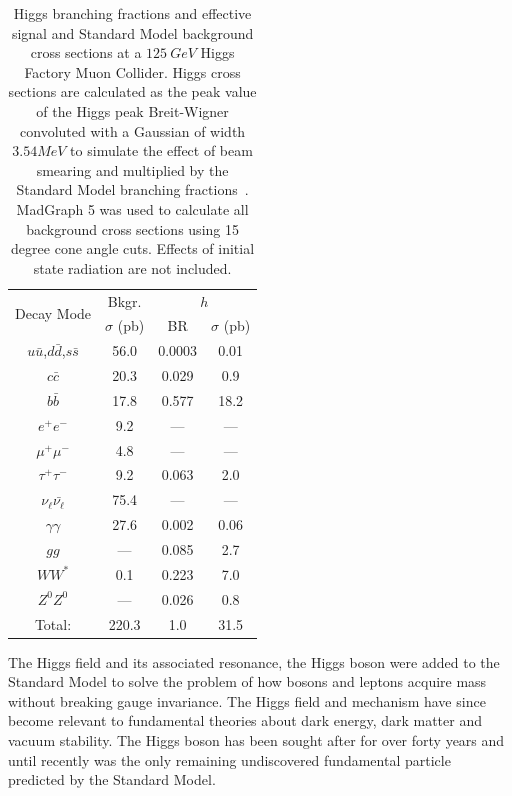 \documentclass[a4paper]{article}
\begin{document}
\begin{table}
	\begin{center}
		\begin{tabular}{|c|c|c|c|}
			\hline
			\multirow{2}{*}{Decay Mode} & Bkgr. & \multicolumn{2}{|c|}{$h$} \\ \cline{2-4}
			 & $\sigma$ (pb) & BR & $\sigma$ (pb) \\ 
			\hline
			$u\bar{u}$,$d\bar{d}$,$s\bar{s}$ & 56.0 & 0.0003 & 0.01 \\ \hline
			$c\bar{c}$      & 20.3 & 0.029 & 0.9 \\ \hline
			$b\bar{b}$      & 17.8 & 0.577 & 18.2 \\ \hline
			$e^+e^-$        & 9.2 & --- & --- \\ \hline
			$\mu^+\mu^-$    & 4.8 & --- & --- \\ \hline
			$\tau^+\tau^-$  & 9.2 & 0.063 & 2.0 \\ \hline
			$\nu_{\ell}\bar{\nu_{\ell}}$    & 75.4  & --- & --- \\ \hline
			$\gamma\gamma$  & 27.6   & 0.002 & 0.06 \\ \hline
			$gg$                    & ---   & 0.085 & 2.7 \\ \hline
			$WW^*$                  & 0.1   & 0.223 & 7.0 \\ \hline
			$Z^0Z^0$                & ---   & 0.026 & 0.8 \\
			\hline \hline
			Total:  & 220.3 & 1.0 & 31.5 \\ \hline
		\end{tabular}
	\end{center}
	\caption{Higgs branching fractions and effective signal and Standard Model background cross sections at a $125~GeV$ Higgs Factory Muon Collider. Higgs cross sections are calculated as the peak value of the Higgs peak Breit-Wigner convoluted with a Gaussian of width $3.54 MeV$ to simulate the effect of beam smearing and multiplied by the Standard Model branching fractions~\cite{higgs-handbook}. MadGraph 5 was used to calculate all background cross sections using 15 degree cone angle cuts. Effects of initial state radiation are not included.\label{bfs-xsects2}}
\end{table}

The Higgs field and its associated resonance, the Higgs boson were added to the Standard Model to solve the problem of how bosons and leptons acquire mass without breaking gauge invariance. The Higgs field and mechanism have since become relevant to fundamental theories about dark energy, dark matter and vacuum stability. The Higgs boson has been sought after for over forty years and until recently was the only remaining undiscovered fundamental particle predicted by the Standard Model.
\end{document}
